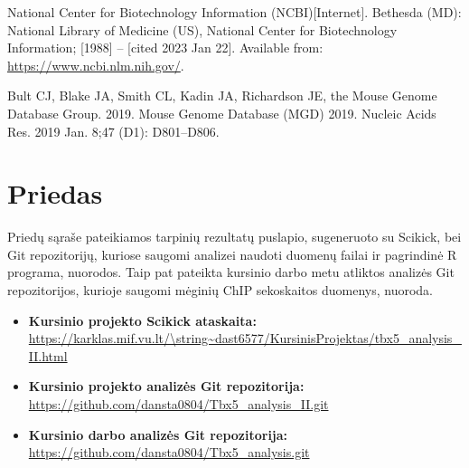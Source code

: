 \documentclass[12pt]{article}
\begin{document}
\begin{thebibliography}{99}
 National Center for Biotechnology Information (NCBI)[Internet].
Bethesda (MD): National Library of Medicine (US), National Center for
Biotechnology Information; [1988] – [cited 2023 Jan 22]. Available from:
\url{https://www.ncbi.nlm.nih.gov/}.

 Bult CJ, Blake JA, Smith CL, Kadin JA, Richardson JE, the
Mouse Genome Database Group. 2019. Mouse Genome Database (MGD) 2019.
Nucleic Acids Res. 2019 Jan. 8;47 (D1): D801–D806.

\end{thebibliography}

\newpage


\section{Priedas} \label{Priedas}
Priedų sąraše pateikiamos tarpinių rezultatų puslapio, sugeneruoto su Scikick,
bei Git re\-po\-zi\-to\-ri\-jų, kuriose saugomi analizei naudoti duomenų
failai ir pagrindinė R programa, nuorodos. Taip pat pateikta kursinio darbo metu
atliktos analizės Git repozitorijos, kurioje saugomi mėginių ChIP sekoskaitos
duomenys, nuoroda.

\begin{itemize}
    \item \textbf{Kursinio projekto Scikick ataskaita:}\\
          \url{https://karklas.mif.vu.lt/\string~dast6577/KursinisProjektas/tbx5\_analysis\_II.html}
    \item \textbf{Kursinio projekto analizės Git repozitorija:}\\
          \url{https://github.com/dansta0804/Tbx5\_analysis\_II.git}
    \item \textbf{Kursinio darbo analizės Git repozitorija:}\\
          \url{https://github.com/dansta0804/Tbx5\_analysis.git}
  \end{itemize}
\end{document}
